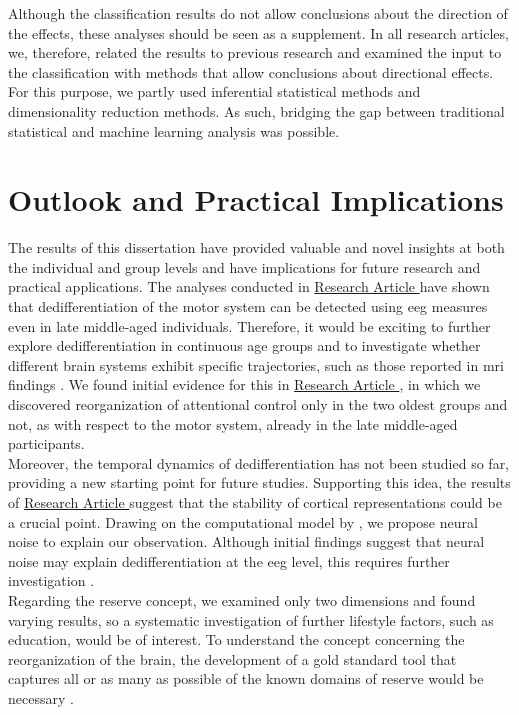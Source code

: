 Although the classification results do not allow conclusions about the direction of the effects, these analyses should be seen as a supplement. In all research articles, we, therefore, related the results to previous research and examined the input to the classification with methods that allow conclusions about directional effects. For this purpose, we partly used inferential statistical methods and dimensionality reduction methods. As such, bridging the gap between traditional statistical and machine learning analysis was possible.

\section{Outlook and Practical Implications}
The results of this dissertation have provided valuable and novel insights at both the individual and group levels and have implications for future research and practical applications. The analyses conducted in \hyperref[results:paperI]{Research Article } have shown that dedifferentiation of the motor system can be detected using \gls{eeg} measures even in late middle-aged individuals. Therefore, it would be exciting to further explore dedifferentiation in continuous age groups and to investigate whether different brain systems exhibit specific trajectories, such as those reported in \gls{mri} findings \cite{Raz2006}. We found initial evidence for this in \hyperref[results:paperII]{Research Article }, in which we discovered reorganization of attentional control only in the two oldest groups and not, as with respect to the motor system, already in the late middle-aged participants.\\
Moreover, the temporal dynamics of dedifferentiation has not been studied so far, providing a new starting point for future studies. Supporting this idea, the results of \hyperref[results:paperIII]{Research Article } suggest that the stability of cortical representations could be a crucial point. Drawing on the computational model by \citeauthor{Li2001} \cite{Li2001, Li2000}, we propose neural noise to explain our observation. Although initial findings suggest that neural noise may explain dedifferentiation at the \gls{eeg} level, this requires further investigation \cite{Pichot2022}.\\
Regarding the reserve concept, we examined only two dimensions and found varying results, so a systematic investigation of further lifestyle factors, such as education, would be of interest. To understand the concept concerning the reorganization of the brain, the development of a gold standard tool that captures all or as many as possible of the known domains of reserve would be necessary \cite{Nogueira2022}.\\
